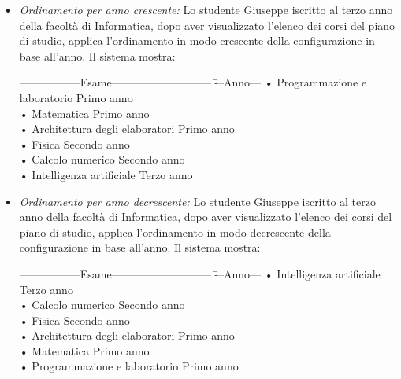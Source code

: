 \begin{itemize}
	\item \textit{Ordinamento per anno crescente:}
	Lo studente Giuseppe iscritto al terzo anno della facoltà di Informatica, dopo aver visualizzato l'elenco dei corsi del piano di studio, applica l'ordinamento in modo crescente della configurazione in base all’anno. Il sistema mostra:
	\begin{tabbing}
		\hspace{1cm}-----------------Esame--------------------------- \= ---Anno--- \kill
		\hspace{1cm} • Programmazione e laboratorio \> Primo anno\\
		\hspace{1cm} • Matematica  \>Primo anno\\
		\hspace{1cm} • Architettura degli elaboratori \> Primo anno\\
		\hspace{1cm} • Fisica \> Secondo anno\\
		\hspace{1cm} • Calcolo numerico \> Secondo anno\\
		\hspace{1cm} • Intelligenza artificiale \> Terzo anno\\
	\end{tabbing}
	
	\item \textit{Ordinamento per anno decrescente:}
	Lo studente Giuseppe iscritto al terzo anno della facoltà di Informatica, dopo aver visualizzato l'elenco dei corsi del piano di studio, applica l'ordinamento in modo decrescente della configurazione in base all’anno. Il sistema mostra:
	\begin{tabbing}
		\hspace{1cm}-----------------Esame--------------------------- \= ---Anno--- \kill
		\hspace{1cm} • Intelligenza artificiale \> Terzo anno\\
		\hspace{1cm} • Calcolo numerico \> Secondo anno\\
		\hspace{1cm} • Fisica \> Secondo anno\\
		\hspace{1cm} • Architettura degli elaboratori \> Primo anno\\
		\hspace{1cm} • Matematica  \>Primo anno\\
		\hspace{1cm} • Programmazione e laboratorio \> Primo anno\\
	\end{tabbing}
	

\end{itemize}
